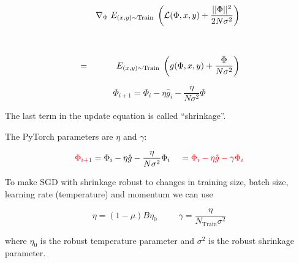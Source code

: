 {

\begin{eqnarray*}
  & & \nabla_\Phi \;E_{(x,y) \sim \mathrm{Train}}\;\left({\cal L}(\Phi,x,y) + \frac{||\Phi||^2}{2N\sigma^2}\right) \\
  \\
  \\
  & = & E_{(x,y) \sim \mathrm{Train}} \;\left(g(\Phi,x,y) + \frac{\Phi}{N\sigma^2}\right)
\end{eqnarray*}

\vfill
$$\Phi_{i+1} = \Phi_i - \eta\hat{g}_i  - \frac{\eta}{N\sigma^2}\Phi$$

\vfill
The last term in the update equation is called ``shrinkage''.


The PyTorch parameters are $\eta$ and $\gamma$:

$${\color{red} \Phi_{i+1}} = \Phi_i - \eta\hat{g} - \frac{\eta}{N\sigma^2}\Phi_i\;\;\;\; = {\color{red} \Phi_i - \eta\hat{g} - \gamma\Phi_i}$$

\vfill
To make SGD with shrinkage robust to changes in training size, batch size, learning rate (temperature) and momentum we can use

\vfill
{\color{red} $$\eta = (1-\mu)B\eta_0\;\;\;\;\;\;\;\;\;\gamma = \frac{\eta}{N_{\mathrm{Train}}\sigma^2}$$}

\vfill
where $\eta_0$ is the robust temperature parameter and $\sigma^2$ is the robust shrinkage parameter.


}

